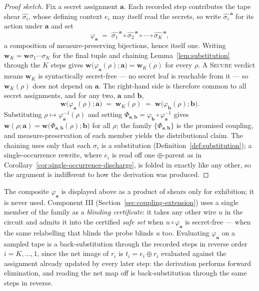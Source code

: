   \begin{proof}[Proof sketch]
  Fix a secret assignment $\mathbf{a}$. Each recorded step contributes the tape
  shear $\widehat{\sigma_i}$, whose defining context $e_i$ may itself read the
  secrets, so write $\widehat{\sigma_i}^{\,\mathbf{a}}$ for its action under
  $\mathbf{a}$ and set
  \[
    \varphi_{\mathbf{a}} \;=\; \widehat{\sigma_1}^{\,\mathbf{a}} \circ
    \widehat{\sigma_2}^{\,\mathbf{a}} \circ \cdots \circ \widehat{\sigma_K}^{\,\mathbf{a}},
  \]
  a composition of measure-preserving bijections, hence itself one. Writing
  $\mathbf{w}_K = \mathbf{w}\sigma_1 \cdots \sigma_K$ for the final tuple and
  chaining Lemma~\ref{lem:substitution} through the $K$ steps gives
  $\mathbf{w}\big(\varphi_{\mathbf{a}}(\rho); \mathbf{a}\big) = \mathbf{w}_K(\rho)$
  for every $\rho$. A \textsc{Secure} verdict means $\mathbf{w}_K$ is
  syntactically secret-free --- no secret leaf is reachable from it --- so
  $\mathbf{w}_K(\rho)$ does not depend on $\mathbf{a}$. The right-hand side is
  therefore common to all secret assignments, and for any two, $\mathbf{a}$ and
  $\mathbf{b}$,
  \[
    \mathbf{w}\big(\varphi_{\mathbf{a}}(\rho); \mathbf{a}\big) \;=\; \mathbf{w}_K(\rho)
    \;=\; \mathbf{w}\big(\varphi_{\mathbf{b}}(\rho); \mathbf{b}\big) .
  \]
  Substituting $\rho \mapsto \varphi_{\mathbf{a}}^{-1}(\rho)$ and setting
  $\Phi_{\mathbf{a},\mathbf{b}} = \varphi_{\mathbf{b}} \circ
  \varphi_{\mathbf{a}}^{-1}$ gives
  $\mathbf{w}(\rho; \mathbf{a}) = \mathbf{w}\big(\Phi_{\mathbf{a},\mathbf{b}}(\rho); \mathbf{b}\big)$
  for all $\rho$; the family $\{\Phi_{\mathbf{a},\mathbf{b}}\}$ is the promised
  coupling, and measure-preservation of each member yields the distributional
  claim. The chaining uses only that each $\sigma_i$ is a substitution
  (Definition~\ref{def:substitution}); a single-occurrence rewrite, where $e_i$
  is read off one $\oplus$-parent as in
  Corollary~\ref{cor:single-occurrence-discharge}, is folded in exactly like any
  other, so the argument is indifferent to how the derivation was produced.
  \end{proof}

  The composite $\varphi_{\mathbf{a}}$ is displayed above as a product of shears
  only for exhibition; it is never used. Component III (Section~\ref{sec:coupling-extension})
  uses a single member of the family as a \emph{blinding certificate}: it takes any
  other wire $u$ in the circuit and admits it into the certified \emph{safe set}
  when $u \circ \varphi_{\mathbf{a}}$ is secret-free --- when the same relabelling
  that blinds the probe blinds $u$ too.
  Evaluating $\varphi_{\mathbf{a}}$ on a sampled tape is a back-substitution
  through the recorded steps in reverse order $i = K, \dots, 1$, since the net
  image of $r_i$ is $t_i = e_i \oplus r_i$ evaluated against the assignment
  already updated by every later step: the derivation performs forward
  elimination, and reading the net map off is back-substitution through the same
  steps in reverse.

